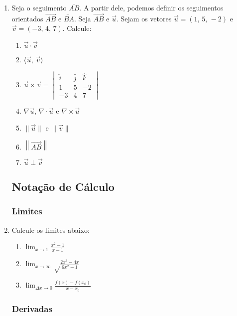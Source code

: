 \documentclass[a4paper,12pt]{article}
\newcommand{\limite}{\displaystyle\lim}
\begin{document}
\begin{enumerate}
  \item Seja o seguimento $\overline{AB}$. A partir dele, podemos definir
  os seguimentos orientados $\overrightarrow{AB}$ e $\overleftarrow{BA}$.
  Seja $\vec{AB}$ e $\vec{u}$. Sejam os vetores $\vec{u} = (1,\,5,\,-2)$
  e $\vec{v} = (-3,\,4,\,7)$. Calcule:
  \begin{enumerate}
   \item $\vec{u}\cdot\vec{v}$
   \item $\langle\vec{u},\,\vec{v}\rangle$
   \item $\vec{u}\times\vec{v} =
    \begin{vmatrix}
     \hat{i} & \hat{j} & \hat{k} \\
     1 & 5 & -2 \\
     -3 & 4 & 7
    \end{vmatrix}
    $
   \item $\nabla\vec{u}$, $\nabla\cdot\vec{u}$ e $\nabla\times\vec{u}$
   \item $\|\vec{u}\|$ e $\|\vec{v}\|$
   \item $\left\|\overrightarrow{AB}\right\|$
   \item $\vec{u}\perp\vec{v}$
  \end{enumerate}
  
\subsection{Notação de Cálculo}
\subsubsection{Limites}
  
  \item Calcule os limites abaixo:
  \begin{enumerate}
   \item $\limite_{x\to 1} \frac{x^2-1}{x-1}$
   \item $\limite_{x\to\infty} \sqrt\frac{2x^3-4x}{6x^2-1}$
   \item $\limite_{\Delta x\to 0} \frac{f(x) - f(x_0)}{x - x_0}$
  \end{enumerate}
  
\subsubsection{Derivadas}  
  

\end{enumerate}
\end{document}
